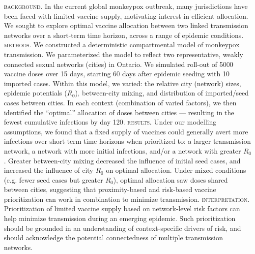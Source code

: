 \renewcommand{\emph}[1]{\textsc{\MakeLowercase{#1}}}
\emph{Background.}
In the current global monkeypox outbreak,
many jurisdictions have been faced with limited vaccine supply,
motivating interest in efficient allocation.
We sought to explore optimal vaccine allocation between two linked transmission networks
over a short-term time horizon, across a range of epidemic conditions.
\emph{Methods.}
We constructed a deterministic compartmental \SVEIR model of monkeypox transmission.
We parameterized the model to reflect
two representative, weakly connected \GBMSM sexual networks (cities) in Ontario.
We simulated roll-out of 5000 vaccine doses over 15 days,
starting 60 days after epidemic seeding with 10 imported cases.
Within this model, we varied:
the relative city (network) sizes,
epidemic potentials ($R_0$),
between-city mixing,
and distribution of imported/seed cases between cities.
In each context (combination of varied factors),
we then identified the ``optimal'' allocation of doses between cities
--- resulting in the fewest cumulative infections by day 120.
\emph{Results.}
Under our modelling assumptions, we found that a fixed supply of vaccines
could generally avert more infections over short-term time horizons when prioritized to:
a larger transmission network,
a network with more initial infections, and/or
a network with greater $R_0$.
Greater between-city mixing decreased the influence of initial seed cases, and
increased the influence of city $R_0$ on optimal allocation.
Under mixed conditions (e.g. fewer seed cases but greater $R_0$),
optimal allocation saw doses shared between cities,
suggesting that proximity-based and risk-based vaccine prioritization
can work in combination to minimize transmission.
\emph{Interpretation.}
Prioritization of limited vaccine supply based on network-level risk factors
can help minimize transmission during an emerging epidemic.
Such prioritization should be grounded in an understanding of context-specific drivers of risk,
and should acknowledge the potential connectedness of multiple transmission networks.
